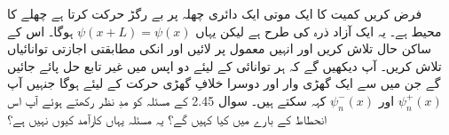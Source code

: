 فرض کریں کمیت  کا ایک موتی ایک دائری چھلہ پر بے رگڑ حرکت کرتا ہے چھلے کا محیط  ہے۔ یہ ایک آزاد ذرہ کی طرح ہے لیکن یہاں \(\psi(x+L) = \psi(x)\) ہوگا۔ اس کے ساکن حال تلاش کریں اور انہیں معمول پر لائیں اور انکی مطابقتی اجازتی توانائیاں تلاش کریں۔ آپ دیکھیں گے کہ ہر توانائی  کے لیئے دو اپس میں غیر تابع حل پائے جائیں گے جن میں سے ایک گھڑی وار اور دوسرا خلافِ گھڑی حرکت کے لیئے ہوگا جنہیں آپ \(\psi_n^+(x)\) اور \(\psi_n^-(x)\) کہہ سکتے ہیں۔ سوال \num{2.45} کے مسئلہ کو مدِ نظر رکھتے ہوئے آپ اس انحطاط کے بارے میں کیا کہیں گے؟ یہ مسئلہ یہاں کارآمد کیوں نہیں ہے؟


